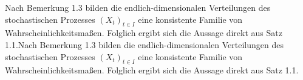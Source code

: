 Nach Bemerkung 1.3 bilden die endlich-dimensionalen Verteilungen des stochastischen Prozesses $(X_{t})_{t\in I}$ eine konsistente Familie von Wahrscheinlichkeitsmaßen. Folglich ergibt sich die Aussage direkt aus Satz 1.1.Nach Bemerkung 1.3 bilden die endlich-dimensionalen Verteilungen des stochastischen Prozesses $(X_{t})_{t\in I}$ eine konsistente Familie von Wahrscheinlichkeitsmaßen. Folglich ergibt sich die Aussage direkt aus Satz 1.1.
